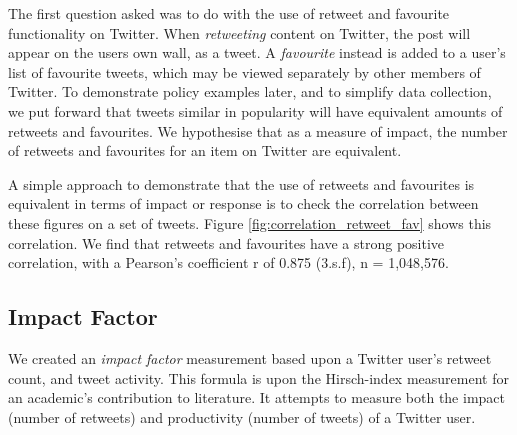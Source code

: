 The first question asked was to do with the use of retweet and favourite functionality on Twitter. When \textit{retweeting} content on Twitter, the post will appear on the users own wall, as a tweet. A \textit{favourite} instead is added to a user's list of favourite tweets, which may be viewed separately by other members of Twitter. To demonstrate policy examples later, and to simplify data collection, we put forward that tweets similar in popularity will have equivalent amounts of retweets and favourites. We hypothesise that as a measure of impact, the number of retweets and favourites for an item on Twitter are equivalent.




A simple approach to demonstrate that the use of retweets and favourites is equivalent in terms of impact or response is to check the correlation between these figures on a set of tweets. Figure \ref{fig:correlation_retweet_fav} shows this correlation. We find that retweets and favourites have a strong positive correlation, with a Pearson's coefficient r of 0.875 (3.s.f), n = 1,048,576. 


\subsection{Impact Factor}

We created an \textit{impact factor} measurement based upon a Twitter user's retweet count, and tweet activity. This formula is upon the Hirsch-index \cite{hirsch2005index} measurement for an academic's contribution to literature. It attempts to measure both the impact (number of retweets) and productivity (number of tweets) of a Twitter user. 

